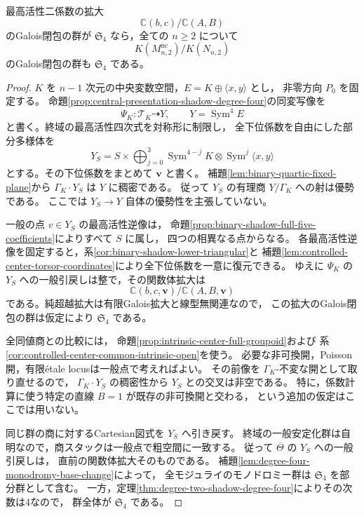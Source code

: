 \begin{proposition}[対称最高活性切断から全モジュライへの移送]
\label{prop:degree-two-symmetric-monodromy-transfer}
最高活性二係数の拡大
\[
        \mathbb C(b,c)/\mathbb C(A,B)
\]
のGalois閉包の群が $\mathfrak S_4$ なら，全ての $n\ge2$ について
\[
 K(M^{\mathrm{nc}}_{n,2})/K(N_{n,2})
\]
のGalois閉包の群も $\mathfrak S_4$ である。
\end{proposition}
\begin{proof}
$K$ を $n-1$ 次元の中央変数空間，$E=K\oplus\langle x,y\rangle$ とし，
非零方向 $P_0$ を固定する。
命題\ref{prop:central-presentation-shadow-degree-four}の同変写像を
\[
             \Psi_K:\mathcal T_K\dashrightarrow Y,
             \qquad Y=\operatorname{Sym}^4E
\]
と書く。終域の最高活性四次式を対称形に制限し，
全下位係数を自由にした部分多様体を
\[
 Y_S=S\times\bigoplus_{j=0}^3
       \operatorname{Sym}^{4-j}K\otimes\operatorname{Sym}^j\langle x,y\rangle
\]
とする。その下位係数をまとめて $\boldsymbol v$ と書く。
補題\ref{lem:binary-quartic-fixed-plane}から
$\Gamma_K\cdot Y_S$ は $Y$ に稠密である。
従って $Y_S$ の有理商 $Y/\Gamma_K$ への射は優勢である。
ここでは $Y_S\to Y$ 自体の優勢性を主張していない。

一般の点 $v\in Y_S$ の最高活性逆像は，
命題\ref{prop:binary-shadow-full-five-coefficients}によりすべて $S$ に属し，
四つの相異なる点からなる。
各最高活性逆像を固定すると，系\ref{cor:binary-shadow-lower-triangular}と
補題\ref{lem:controlled-center-torsor-coordinates}により全下位係数を一意に復元できる。
ゆえに $\Psi_K$ の $Y_S$ への一般引戻しは整で，その関数体拡大は
\[
       \mathbb C(b,c,\boldsymbol v)
          /\mathbb C(A,B,\boldsymbol v)
\]
である。純超越拡大は有限Galois拡大と線型無関連なので，
この拡大のGalois閉包の群は仮定により $\mathfrak S_4$ である。

全同値商との比較には，
命題\ref{prop:intrinsic-center-full-groupoid}および
系\ref{cor:controlled-center-common-intrinsic-open}を使う。
必要な非可換開，Poisson開，有限\'{e}tale locusは一般点で考えればよい。
その前像を $\Gamma_K$-不変な開として取り直せるので，
$\Gamma_K\cdot Y_S$ の稠密性から $Y_S$ との交叉は非空である。
特に，係数計算に使う特定の直線 $B=1$ が既存の非可換開と交わる，
という追加の仮定はここでは用いない。

同じ群の商に対するCartesian図式を $Y_S$ へ引き戻す。
終域の一般安定化群は自明なので，商スタックは一般点で粗空間に一致する。
従って $\overline\Theta$ の $Y_S$ への一般引戻しは，
直前の関数体拡大そのものである。
補題\ref{lem:degree-four-monodromy-base-change}によって，
全モジュライのモノドロミー群は $\mathfrak S_4$ を部分群として含む。
一方，定理\ref{thm:degree-two-shadow-degree-four}によりその次数は4なので，
群全体が $\mathfrak S_4$ である。
\end{proof}

